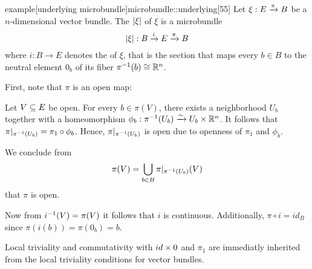 \begin{mystatement}{example}[underlying microbundle]{microbundle::underlying}[55]
    Let $\xi: E \xto{\pi} B$ be a $n$-dimensional vector bundle.
    The  $\abs{\xi}$ of $\xi$ is a microbundle
    \[ \bundledef{\abs{\xi}}{B}{E}{i}{\pi} \]
    where $i: B \to E$ denotes the  of $\xi$, that is
    the section that maps every $b \in B$ to the neutral element $0_b$
    of its fiber $\inv{\pi}(b) \cong \R^n$.
\end{mystatement}

\begin{myproof}
    First, note that $\pi$ is an open map:

    Let $V \sub E$ be open.
    For every $b \in \pi(V)$, there exists a neighborhood $U_b$
    together with a homeomorphism $\phi_b: \inv{\pi}(U_b) \isomto U_b \times \R^n$.
    It follows that $\pi\restr{\inv{\pi}(U_b)} = \pi_1 \circ \phi_b$.
    Hence, $\pi\restr{\inv{\pi}(U_b)}$ is open due to openness of $\pi_1$ and $\phi_b$.

    We conclude from
    \[ \pi(V) = \bigcup_{b \in B} \pi\restr{\inv{\pi}(U_b)}(V) \]
    that $\pi$ is open.

    Now from $\inv{i}(V) = \pi(V)$ it follows that $i$ is continuous.
    Additionally, $\pi \circ i = id_B$ since $\pi(i(b)) = \pi(0_b) = b$. 

    Local triviality and commutativity with $id \cross 0$ and $\pi_1$
    are immediatly inherited from the local triviality conditions for vector bundles.
\end{myproof}